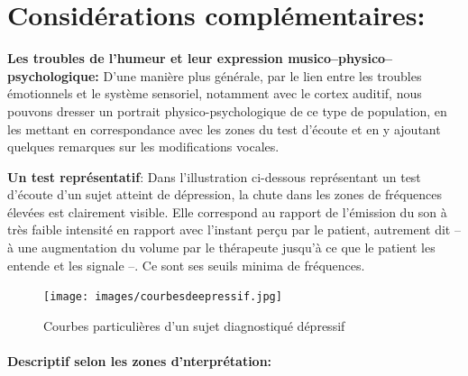      \section{Considérations complémentaires:}


 \textbf{Les troubles de l'humeur et leur expression
    musico--physico--psychologique:}
  D'une manière plus générale, par le lien entre les troubles
 émotionnels et le
système sensoriel, notamment avec le cortex auditif, nous
pouvons dresser un portrait
physico-psychologique de ce type de population,
  en les mettant en correspondance avec les zones du test d'écoute et
  en y ajoutant quelques remarques sur les modifications vocales.

  \textbf{Un test représentatif}:
Dans l'illustration ci-dessous représentant un test
d'écoute d'un sujet atteint de dépression, la
chute dans les zones de fréquences élevées est
clairement visible. Elle correspond au rapport de l'émission du son à
très faible intensité en rapport avec
l'instant perçu par le
patient, autrement dit  -- à une augmentation
du volume
par le thérapeute jusqu'à ce que le patient les entende et les signale
--.
Ce sont ses seuils minima de fréquences.
 \begin{figure}[ht]
	\centering
	\texttt{[image: images/courbesdeepressif.jpg]}
	\caption{Courbes particulières d'un sujet diagnostiqué dépressif}
	\label{fig:courbes du dépressif}
      \end{figure}




      \paragraph{Descriptif selon les zones d'nterprétation:}

